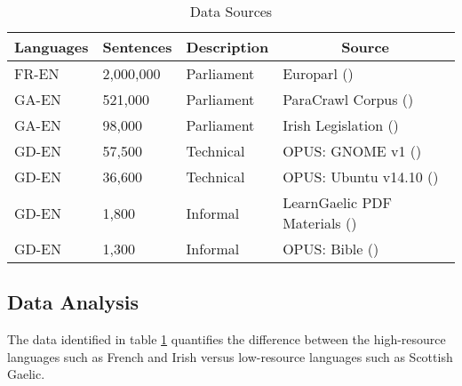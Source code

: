 \begin{table}[!ht]
\centering
\begin{tabular}{|l|l|l|l|}
\hline
\multicolumn{1}{|c|}{\textbf{Languages}} & \multicolumn{1}{c|}{\textbf{Sentences}} & \textbf{Description} & \multicolumn{1}{c|}{\textbf{Source}}                        \\ \hline
FR-EN                                    & 2,000,000                                   & Parliament           & Europarl (\cite{french_corpus_2005})                        \\ \hline
GA-EN                                    & 521,000                                     & Parliament           & ParaCrawl Corpus (\cite{irish_paracrawl_2020}) \\ \hline
GA-EN                                    & 98,000                                     & Parliament           & Irish Legislation (\cite{irish_corpus_2017}) \\ \hline
GD-EN                                    & 57,500                                   & Technical            & OPUS: GNOME v1 (\cite{tiedemann_opus_2012})                 \\ \hline
GD-EN                                    & 36,600                                 & Technical            & OPUS: Ubuntu v14.10 (\cite{tiedemann_opus_2012})            \\ \hline
GD-EN                                    & 1,800                                   & Informal             & LearnGaelic PDF Materials (\cite{learn_gaelic_2019})        \\ \hline
GD-EN                                    & 1,300                                 & Informal             & OPUS: Bible (\cite{bible_corpus_2015})                      \\ \hline

\end{tabular}
\caption{\label{tab:available-data} Data Sources}

\end{table}


\subsection{Data Analysis}

The data identified in table \ref{tab:available-data} quantifies the difference between the high-resource languages such as French and Irish versus low-resource languages such as Scottish Gaelic. 

